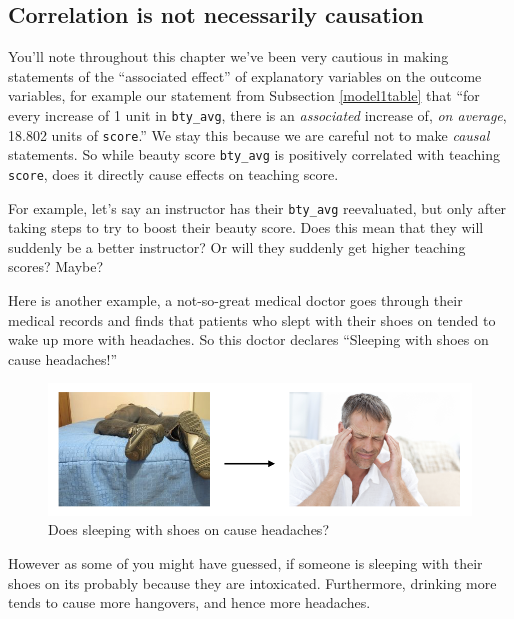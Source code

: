 \documentclass[12pt,]{krantz}
\begin{document}
\subsection{Correlation is not necessarily
causation}\label{correlation-is-not-causation}

You'll note throughout this chapter we've been very cautious in making
statements of the ``associated effect'' of explanatory variables on the
outcome variables, for example our statement from Subsection
\ref{model1table} that ``for every increase of 1 unit in
\texttt{bty\_avg}, there is an \emph{associated} increase of, \emph{on
average}, 18.802 units of \texttt{score}.'' We stay this because we are
careful not to make \emph{causal} statements. So while beauty score
\texttt{bty\_avg} is positively correlated with teaching \texttt{score},
does it directly cause effects on teaching score.

For example, let's say an instructor has their \texttt{bty\_avg}
reevaluated, but only after taking steps to try to boost their beauty
score. Does this mean that they will suddenly be a better instructor? Or
will they suddenly get higher teaching scores? Maybe?

Here is another example, a not-so-great medical doctor goes through
their medical records and finds that patients who slept with their shoes
on tended to wake up more with headaches. So this doctor declares
``Sleeping with shoes on cause headaches!''

\begin{figure}

{\centering \includegraphics[width=\textwidth]{images/flowcharts/flowchart.010-cropped} 

}

\caption{Does sleeping with shoes on cause headaches?}\label{fig:moderndive-figure-causal-graph-2}
\end{figure}

However as some of you might have guessed, if someone is sleeping with
their shoes on its probably because they are intoxicated. Furthermore,
drinking more tends to cause more hangovers, and hence more headaches.
\end{document}
